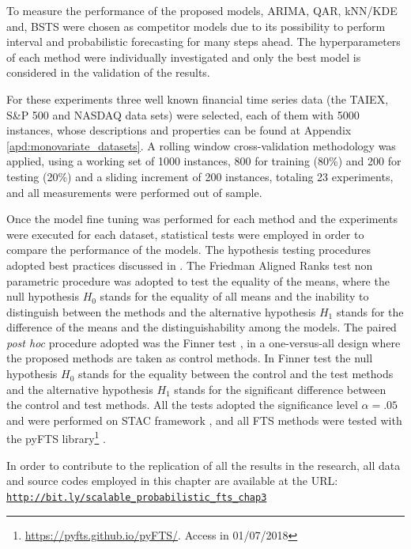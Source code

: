 To measure the performance of the proposed models, ARIMA, QAR, kNN/KDE and, BSTS were chosen as competitor models due to its possibility to perform interval and probabilistic forecasting for many steps ahead. The hyperparameters of each method were individually investigated and only the best model is considered in the validation of the results.

For these experiments three well known financial time series data (the TAIEX, S\&P 500 and NASDAQ data sets) were selected, each of them with 5000 instances, whose descriptions and properties can be found at Appendix \ref{apd:monovariate_datasets}. A rolling window cross-validation methodology \cite{Tashman2000} was applied, using a working set of 1000 instances, 800 for training (80\%) and 200 for testing (20\%) and a sliding increment of 200 instances, totaling 23 experiments, and all measurements were performed out of sample.

Once the model fine tuning was performed for each method and the experiments were executed for each dataset, statistical tests were employed in order to compare the performance of the models. The hypothesis testing procedures adopted best practices discussed in \cite{Garcia2010,Derrac2011,Trawinski2012}. The Friedman Aligned Ranks test \cite{friedmanalignedrankstest} non parametric procedure was adopted to test the equality of the means, where the null hypothesis $H_0$ stands for the equality of all means and the inability to distinguish between the methods and the alternative hypothesis $H_1$ stands for the difference of the means and the distinguishability among the models. The paired \textit{post hoc} procedure adopted was the Finner test \cite{finnertest}, in a one-versus-all design where the proposed methods are taken as control methods. In Finner test  the null hypothesis $H_0$ stands for the equality between the control and the test methods and the alternative hypothesis $H_1$ stands for the significant difference between the control and test methods. All the tests adopted the significance level $\alpha = .05$ and were performed on STAC framework \cite{stac}, and all FTS methods were tested with the pyFTS library\footnote{\url{https://pyfts.github.io/pyFTS/}. Access in 01/07/2018} \cite{pyFTS}. 

In order to contribute to the replication of all the results in the research, all data and source codes employed in this chapter are available at the URL:
\texttt{\url{http://bit.ly/scalable_probabilistic_fts_chap3}}

%
